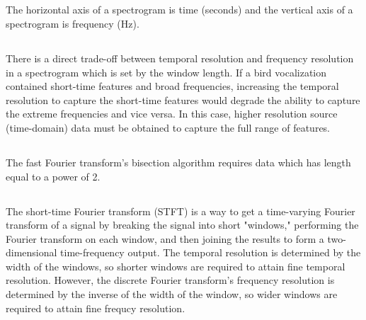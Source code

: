 \documentclass[11pt]{article}
\begin{document}
\subsection{} %
\begin{mdframed}
    The horizontal axis of a spectrogram is time (seconds) and the vertical axis
    of a spectrogram is frequency (Hz).
\end{mdframed}

\subsection{} %
\begin{mdframed}
    There is a direct trade-off between temporal resolution and frequency
    resolution in a spectrogram which is set by the window length. If a bird
    vocalization contained short-time features and broad frequencies, increasing
    the temporal resolution to capture the short-time features would degrade the
    ability to capture the extreme frequencies and vice versa. In this case,
    higher resolution source (time-domain) data must be obtained to capture the
    full range of features.
\end{mdframed}

\subsection{} %
\begin{mdframed}
    The fast Fourier transform's bisection algorithm requires data which has
    length equal to a power of 2.
\end{mdframed}

\subsection{} %
\begin{mdframed}
    The short-time Fourier transform (STFT) is a way to get a time-varying
    Fourier transform of a signal by breaking the signal into short "windows,"
    performing the Fourier transform on each window, and then joining the
    results to form a  two-dimensional time-frequency output. The temporal
    resolution is determined by the width of the windows, so shorter windows
    are required to attain fine temporal resolution. However, the discrete
    Fourier transform's frequency resolution is determined by the inverse of the
    width of the window, so wider windows are required to attain fine frequcy
    resolution.
\end{mdframed}
\end{document}
